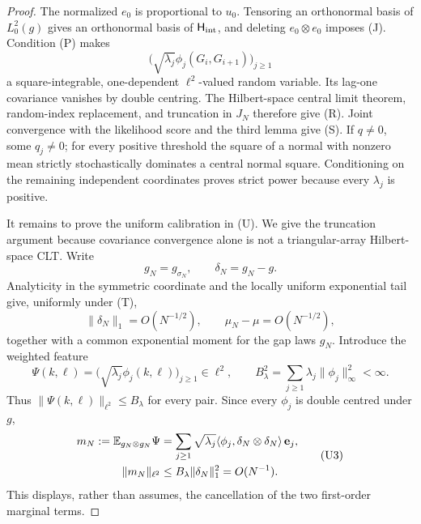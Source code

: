 \begin{proof}
The normalized $e_0$ is proportional to $u_0$.  Tensoring an orthonormal
basis of $L^2_0(g)$ gives an orthonormal basis of
$\mathsf H_{\rm int}$, and deleting $e_0\otimes e_0$ imposes \textup{(J)}.
Condition \textup{(P)} makes
\[
 \bigl(\sqrt{\lambda_j}\phi_j(G_i,G_{i+1})\bigr)_{j\geq1}
\]
a square-integrable, one-dependent $\ell^2$-valued random variable.  Its
lag-one covariance vanishes by double centring.  The Hilbert-space central
limit theorem, random-index replacement, and truncation in $J_N$ therefore
give \textup{(R)}.  Joint convergence with the likelihood score and the third
lemma give \textup{(S)}.  If $q\neq0$, some $q_j\neq0$; for every positive
threshold the square of a normal with nonzero mean strictly stochastically
dominates a central normal square.  Conditioning on the remaining independent
coordinates proves strict power because every $\lambda_j$ is positive.

It remains to prove the uniform calibration in \textup{(U)}.  We give the
truncation argument because covariance convergence alone is not a
triangular-array Hilbert-space CLT.  Write
\[
 g_N=g_{\sigma_N},\qquad \delta_N=g_N-g .
\]
Analyticity in the symmetric coordinate and the locally uniform exponential
tail give, uniformly under \textup{(T)},
\[
 \|\delta_N\|_1=O(N^{-1/2}),\qquad
 \mu_N-\mu=O(N^{-1/2}),
\tag{U1}
\]
together with a common exponential moment for the gap laws \(g_N\).
Introduce the weighted feature
\[
 \Psi(k,\ell)=
 \bigl(\sqrt{\lambda_j}\phi_j(k,\ell)\bigr)_{j\ge1}\in\ell^2,
\qquad
 B_\lambda^2=\sum_{j\ge1}\lambda_j\|\phi_j\|_\infty^2<\infty .
\tag{U2}
\]
Thus \(\|\Psi(k,\ell)\|_{\ell^2}\le B_\lambda\) for every pair.  Since every
\(\phi_j\) is double centred under \(g\),
\[
\begin{split}
 m_N:=\mathbb E_{g_N\otimes g_N}\Psi
 &=\sum_{j\ge1}\sqrt{\lambda_j}
 \langle\phi_j,\delta_N\otimes\delta_N\rangle\,\mathbf e_j,\\
 \|m_N\|_{\ell^2}
 &\le B_\lambda\|\delta_N\|_1^2=O(N^{-1}).
\end{split}
\tag{U3}
\]
This displays, rather than assumes, the cancellation of the two first-order
marginal terms.


\end{proof}
